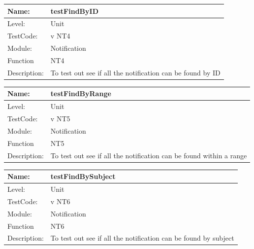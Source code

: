 \documentclass[12pt]{article}
\begin{document}
\begin{center}
\begin{tabular}{|l|p{12cm}|}
\hline

 Name: & testFindByID  \\
\hline
Level: & Unit \\
\hline
TestCode: & v NT4 \\
\hline
Module:& Notification\\
\hline
Function & NT4 \\
\hline
Description: & To test out see if all the notification can be found by ID \\
\hline

\end{tabular}
\end{center}

\begin{center}
\begin{tabular}{|l|p{12cm}|}
\hline

 Name: & testFindByRange  \\
\hline
Level: & Unit \\
\hline
TestCode: & v NT5 \\
\hline
Module:& Notification\\
\hline
Function & NT5 \\
\hline
Description: & To test out see if all the notification can be found within a range \\
\hline

\end{tabular}
\end{center}

\begin{center}
\begin{tabular}{|l|p{12cm}|}
\hline

 Name: & testFindBySubject  \\
\hline
Level: & Unit \\
\hline
TestCode: & v NT6 \\
\hline
Module:& Notification\\
\hline
Function & NT6 \\
\hline
Description: & To test out see if all the notification can be found by subject \\
\hline

\end{tabular}
\end{center}
\end{document}
